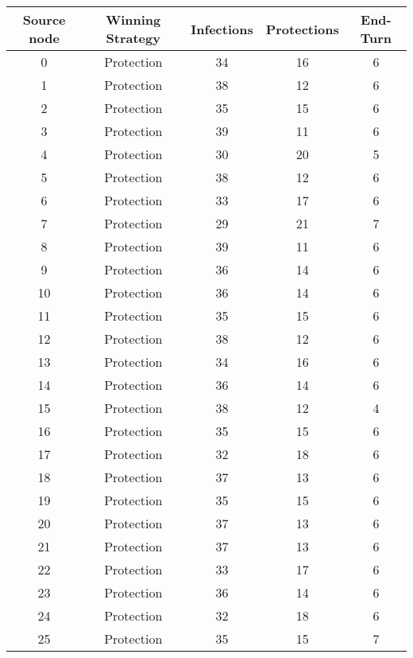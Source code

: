 \documentclass[results.tex]{subfiles}
\begin{document}
\begin{center}
  \begin{tabular}{| c || c | c | c | c |}
    \hline
    {\bfseries Source node} & {\bfseries Winning Strategy} & {\bfseries Infections} & {\bfseries Protections} & {\bfseries End-Turn} \\  %
    \hline\hline
    0 & Protection & 34 & 16 & 6 \\ 
    \hline
    1 & Protection & 38 & 12 & 6 \\ 
    \hline
    2 & Protection & 35 & 15 & 6 \\ 
    \hline
    3 & Protection & 39 & 11 & 6 \\ 
    \hline
    4 & Protection & 30 & 20 & 5 \\ 
    \hline
    5 & Protection & 38 & 12 & 6 \\ 
    \hline
    6 & Protection & 33 & 17 & 6 \\ 
    \hline
    7 & Protection & 29 & 21 & 7 \\ 
    \hline
    8 & Protection & 39 & 11 & 6 \\ 
    \hline
    9 & Protection & 36 & 14 & 6 \\ 
    \hline
    10 & Protection & 36 & 14 & 6 \\ 
    \hline
    11 & Protection & 35 & 15 & 6 \\ 
    \hline
    12 & Protection & 38 & 12 & 6 \\ 
    \hline
    13 & Protection & 34 & 16 & 6 \\ 
    \hline
    14 & Protection & 36 & 14 & 6 \\ 
    \hline
    15 & Protection & 38 & 12 & 4 \\ 
    \hline
    16 & Protection & 35 & 15 & 6 \\ 
    \hline
    17 & Protection & 32 & 18 & 6 \\ 
    \hline
    18 & Protection & 37 & 13 & 6 \\ 
    \hline
    19 & Protection & 35 & 15 & 6 \\ 
    \hline
    20 & Protection & 37 & 13 & 6 \\ 
    \hline
    21 & Protection & 37 & 13 & 6 \\ 
    \hline
    22 & Protection & 33 & 17 & 6 \\ 
    \hline
    23 & Protection & 36 & 14 & 6 \\ 
    \hline
    24 & Protection & 32 & 18 & 6 \\ 
    \hline
    25 & Protection & 35 & 15 & 7 \\ 

\end{tabular}
\end{center}
\end{document}
